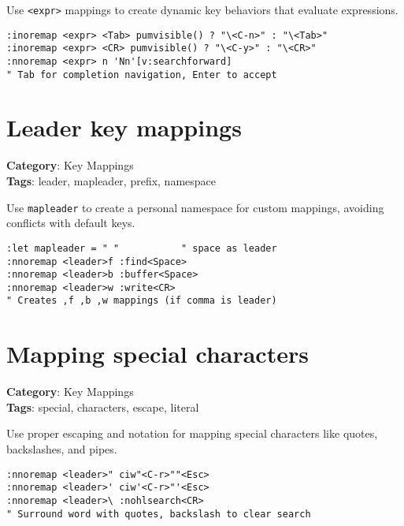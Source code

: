 Use {\footnotesize \Verb§<expr>§} mappings to create dynamic key behaviors that evaluate expressions.

\begin{Exa*}{}
\begin{Verbatim}[fontsize=\footnotesize, breaklines, breakanywhere]
:inoremap <expr> <Tab> pumvisible() ? "\<C-n>" : "\<Tab>"
:inoremap <expr> <CR> pumvisible() ? "\<C-y>" : "\<CR>"
:nnoremap <expr> n 'Nn'[v:searchforward]
" Tab for completion navigation, Enter to accept
\end{Verbatim}
\end{Exa*}

\section{Leader key mappings}

\textbf{Category}: Key Mappings\\ \textbf{Tags}: leader, mapleader, prefix, namespace
\vspace{0.5cm}

Use {\footnotesize \Verb§mapleader§} to create a personal namespace for custom mappings, avoiding conflicts with default keys.

\begin{Exa*}{}
\begin{Verbatim}[fontsize=\footnotesize, breaklines, breakanywhere]
:let mapleader = " "           " space as leader
:nnoremap <leader>f :find<Space>
:nnoremap <leader>b :buffer<Space>
:nnoremap <leader>w :write<CR>
" Creates ,f ,b ,w mappings (if comma is leader)
\end{Verbatim}
\end{Exa*}

\section{Mapping special characters}

\textbf{Category}: Key Mappings\\ \textbf{Tags}: special, characters, escape, literal
\vspace{0.5cm}

Use proper escaping and notation for mapping special characters like quotes, backslashes, and pipes.

\begin{Exa*}{}
\begin{Verbatim}[fontsize=\footnotesize, breaklines, breakanywhere]
:nnoremap <leader>" ciw"<C-r>""<Esc>
:nnoremap <leader>' ciw'<C-r>"'<Esc>
:nnoremap <leader>\ :nohlsearch<CR>
" Surround word with quotes, backslash to clear search
\end{Verbatim}
\end{Exa*}

